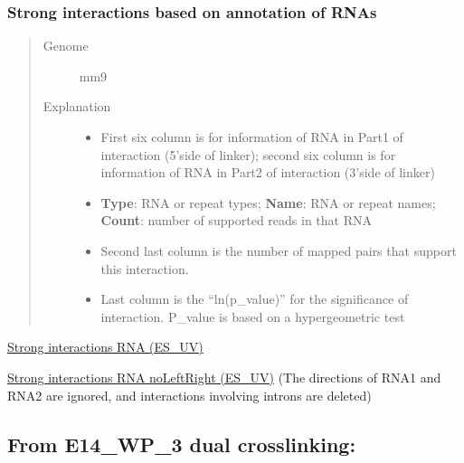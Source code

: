 \documentclass[letterpaper,10pt,english]{sphinxmanual}
\begin{document}
\subsubsection{Strong interactions based on annotation of RNAs}
\label{Data_Resources:strong-interactions-based-on-annotation-of-rnas}\begin{quote}\begin{description}
\item[{Genome}] \leavevmode
mm9

\item[{Explanation}] \leavevmode\begin{itemize}
\item {} 
First six column is for information of RNA in Part1 of interaction (5'side of linker); second six column is for information of RNA in Part2 of interaction (3'side of linker)

\item {} 
\textbf{Type}: RNA or repeat types; \textbf{Name}: RNA or repeat names; \textbf{Count}: number of supported reads in that RNA

\item {} 
Second last column is the number of mapped pairs that support this interaction.

\item {} 
Last column is the ``ln(p\_value)'' for the significance of interaction. P\_value is based on a hypergeometric test

\end{itemize}

\end{description}\end{quote}

\href{http://systemsbio.ucsd.edu/RNA-Hi-C/Data/ACCT\_GGCG\_interaction\_clusters\_RNA.xlsx}{Strong interactions RNA (ES\_UV)}

\href{http://systemsbio.ucsd.edu/RNA-Hi-C/Data/ACCT\_GGCG\_interaction\_clusters\_RNA\_noLeftRight.xlsx}{Strong interactions RNA noLeftRight (ES\_UV)} (The directions of RNA1 and RNA2 are ignored, and interactions involving introns are deleted)


\subsection{From E14\_WP\_3 dual crosslinking:}
\label{Data_Resources:from-e14-wp-3-dual-crosslinking}
\end{document}
